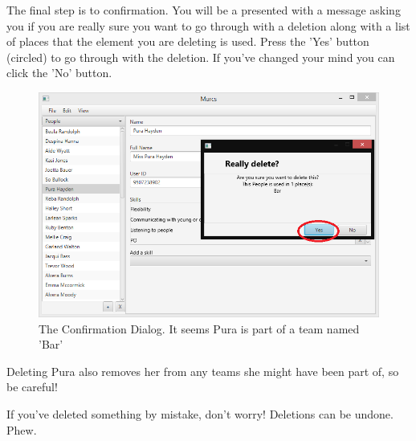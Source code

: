 The final step is to confirmation. You will be a presented with a message asking you if you are really sure you want to go through with a deletion along with a list of places that the element you are deleting is used. Press the 'Yes' button (circled) to go through with the deletion. If you've changed your mind you can click the 'No' button. 

\begin{figure}[H]
\centering
\includegraphics[width=\textwidth]{images/screenshots/deletion3.PNG}
\caption{The Confirmation Dialog. It seems Pura is part of a team named 'Bar'}
\label{fig:new_project}
\end{figure}

Deleting Pura also removes her from any teams she might have been part of, so be careful!

If you've deleted something by mistake, don't worry! Deletions can be undone. Phew.